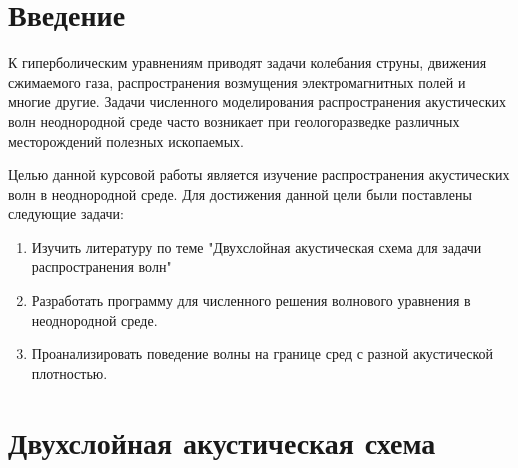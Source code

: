 \documentclass[a4paper, fontsize=14pt]{article}
\begin{document}

\newpage
\tableofcontents
\newpage
\section*{Введение}
К гиперболическим уравнениям приводят задачи колебания струны, движения сжимаемого газа,
распространения возмущения электромагнитных полей и многие другие. Задачи численного моделирования
распространения акустических волн неоднородной среде часто возникает при геологоразведке различных
месторождений полезных ископаемых. 

Целью данной курсовой работы является изучение распространения акустических волн в неоднородной
среде. Для достижения данной цели были поставлены следующие задачи:
\begin{enumerate}
    \item Изучить литературу по теме "Двухслойная акустическая схема для задачи распространения волн"
    \item Разработать программу для численного решения волнового уравнения в неоднородной среде.
    \item Проанализировать поведение волны на границе сред с разной акустической плотностью.
\end{enumerate}
\newpage
\section{Двухслойная акустическая схема}
\end{document}
